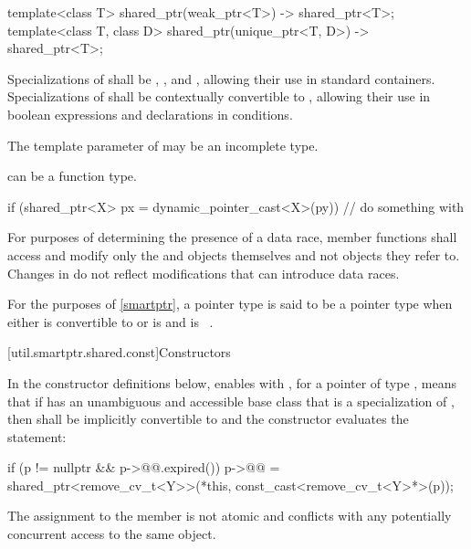 \begin{codeblock}
{  template<class T>
    shared_ptr(weak_ptr<T>) -> shared_ptr<T>;
  template<class T, class D>
    shared_ptr(unique_ptr<T, D>) -> shared_ptr<T>;
}
\end{codeblock}

\pnum
Specializations of  shall be ,
, and , allowing their use in standard
containers. Specializations of  shall be
contextually convertible to ,
allowing their use in boolean expressions and declarations in conditions.

\pnum
The template parameter  of 
may be an incomplete type.
\begin{note}
 can be a function type.
\end{note}

\pnum
\begin{example}
\begin{codeblock}
if (shared_ptr<X> px = dynamic_pointer_cast<X>(py)) {
  // do something with 
}
\end{codeblock}
\end{example}

\pnum
For purposes of determining the presence of a data race, member functions shall
access and modify only the  and  objects
themselves and not objects they refer to. Changes in  do not
reflect modifications that can introduce data races.

\pnum
For the purposes of \ref{smartptr},
a pointer type  is said to be
a pointer type  when either
 is convertible to  or
 is  and  is \cv{}~.

[util.smartptr.shared.const]{Constructors}

\pnum
In the constructor definitions below,
enables  with ,
for a pointer  of type ,
means that if  has an unambiguous and accessible base class
that is a specialization of ,
then  shall be implicitly convertible to  and
the constructor evaluates the statement:
\begin{codeblock}
if (p != nullptr && p->@@.expired())
  p->@@ = shared_ptr<remove_cv_t<Y>>(*this, const_cast<remove_cv_t<Y>*>(p));
\end{codeblock}
The assignment to the  member is not atomic and
conflicts with any potentially concurrent access to the same object.

